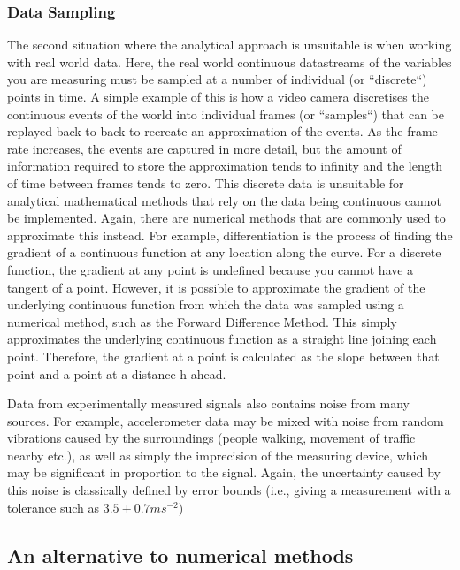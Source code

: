 \documentclass[12pt]{article}
\begin{document}
    \subsubsection{Data Sampling}
    The second situation where the analytical approach is unsuitable is when working with real world data.
    Here, the real world continuous datastreams of the variables you are measuring must be sampled at a number of individual (or ``discrete``) points in time.
    A simple example of this is how a video camera discretises the continuous events of the world into individual frames (or ``samples``) that can be replayed back-to-back to recreate an approximation of the events.
    As the frame rate increases, the events are captured in more detail, but the amount of information required to store the approximation tends to infinity and the length of time between frames tends to zero.
    This discrete data is unsuitable for analytical mathematical methods that rely on the data being continuous cannot be implemented.
    Again, there are numerical methods that are commonly used to approximate this instead.
    For example, differentiation is the process of finding the gradient of a continuous function at any location along the curve.
    For a discrete function, the gradient at any point is undefined because you cannot have a tangent of a point.
    However, it is possible to approximate the gradient of the underlying continuous function from which the data was sampled using a numerical method, such as the Forward Difference Method.
    This simply approximates the underlying continuous function as a straight line joining each point.
    Therefore, the gradient at a point is calculated as the slope between that point and a point at a distance h ahead.

    Data from experimentally measured signals also contains noise from many sources.
    For example, accelerometer data may be mixed with noise from random vibrations caused by the surroundings (people walking, movement of traffic nearby etc.), as well as simply the imprecision of the measuring device, which may be significant in proportion to the signal.
    Again, the uncertainty caused by this noise is classically defined by error bounds (i.e., giving a measurement with a tolerance such as $3.5 \pm 0.7 ms^{-2}$)

    \subsection{An alternative to numerical methods}
\end{document}
